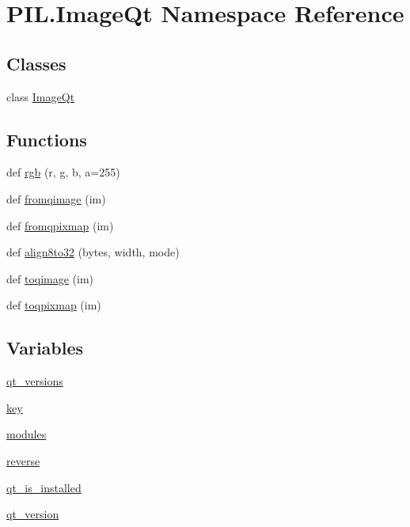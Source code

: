 \hypertarget{namespacePIL_1_1ImageQt}{}\section{P\+I\+L.\+Image\+Qt Namespace Reference}
\label{namespacePIL_1_1ImageQt}
\subsection*{Classes}
\begin{DoxyCompactItemize}
\item 
class \hyperlink{classPIL_1_1ImageQt_1_1ImageQt}{Image\+Qt}
\end{DoxyCompactItemize}
\subsection*{Functions}
\begin{DoxyCompactItemize}
\item 
def \hyperlink{namespacePIL_1_1ImageQt_a33c2b4d234dfbddcc4f6aefb77f1b6a1}{rgb} (r, g, b, a=255)
\item 
def \hyperlink{namespacePIL_1_1ImageQt_ad510ec753a9119055e98fe0ef911e18d}{fromqimage} (im)
\item 
def \hyperlink{namespacePIL_1_1ImageQt_af69a8c5e004cb79204304b6ac41f8922}{fromqpixmap} (im)
\item 
def \hyperlink{namespacePIL_1_1ImageQt_a1425104b8ddc3ebb25ec2ceb7d6043e6}{align8to32} (bytes, width, mode)
\item 
def \hyperlink{namespacePIL_1_1ImageQt_a09bd32ef33352417e2e0cdb9e0d754f6}{toqimage} (im)
\item 
def \hyperlink{namespacePIL_1_1ImageQt_a9ca9c12baf9f16dc260e6f981750fa9a}{toqpixmap} (im)
\end{DoxyCompactItemize}
\subsection*{Variables}
\begin{DoxyCompactItemize}
\item 
\hyperlink{namespacePIL_1_1ImageQt_ad63174e1c7355d785a63f3d69f7b01e0}{qt\+\_\+versions}
\item 
\hyperlink{namespacePIL_1_1ImageQt_af1c0aee5a3ca339899518a64791e93b8}{key}
\item 
\hyperlink{namespacePIL_1_1ImageQt_ab2c81a38d955741338f7a57557c819ff}{modules}
\item 
\hyperlink{namespacePIL_1_1ImageQt_a25d9a4a9ca0832f3d4c76b73fef99ea4}{reverse}
\item 
\hyperlink{namespacePIL_1_1ImageQt_a5eb11bdd01a1e5d8c07bd713f884c372}{qt\+\_\+is\+\_\+installed}
\item 
\hyperlink{namespacePIL_1_1ImageQt_a956e5126744a199ab5b7610dd322908b}{qt\+\_\+version}
\end{DoxyCompactItemize}


